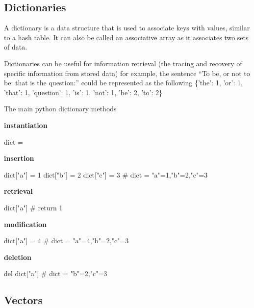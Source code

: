 \subsection{Dictionaries}
  
  A dictionary is a data structure that is used to associate keys with values, similar to a hash table. It can also be called an associative array as it associates two sets of data.
  
  Dictionaries can be useful for information retrieval (the tracing and recovery of specific information from stored data) for example, the sentence ``To be, or not to be: that is the question:'' could be represented as the following \{'the': 1, 'or': 1, 'that': 1, 'question': 1, 'is': 1, 'not': 1, 'be': 2, 'to': 2\}
  
  The main python dictionary methods
  
  \textbf{instantiation}
  
 \begin{python}
 dict = {}
 \end{python}
  
  \textbf{insertion}

\begin{python}
dict["a"] = 1
dict["b"] = 2
dict["c"] = 3
# dict = {"a"=1,"b"=2,"c"=3}
\end{python}
  
  \textbf{retrieval}

\begin{python}
dict["a"]
# return 1
\end{python}

  \textbf{modification}
  
\begin{python}
dict["a"] = 4
# dict = {"a"=4,"b"=2,"c"=3}
\end{python}

  \textbf{deletion}
  
\begin{python}
del dict["a"]
# dict = {"b"=2,"c"=3}
\end{python}
  
  
\subsection{Vectors}
  
